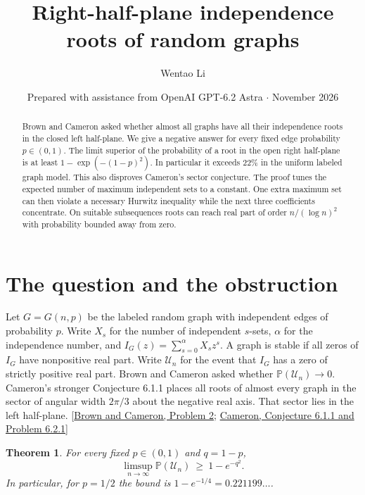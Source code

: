 \documentclass[11pt]{article}
\title{Right-half-plane independence roots of random graphs}
\author{Wentao Li}
\date{Prepared with assistance from OpenAI GPT-6.2 Astra \enspace$\cdot$\enspace 18 November 2026}
\newtheorem{theorem}{Theorem}
\newcommand{\Prob}{\mathbb P}
\newcommand{\Unst}{\mathcal U}
\begin{document}
\maketitle
\begin{abstract}
Brown and Cameron asked whether almost all graphs have all their
independence roots in the closed left half-plane. We give a negative
answer for every fixed edge probability $p\in(0,1)$. The limit superior
of the probability of a root in the open right half-plane is at least
$1-\exp(-(1-p)^2)$. In particular it exceeds $22\%$ in the uniform
labeled graph model. This also disproves Cameron's sector conjecture.
The proof tunes the expected number of maximum independent sets to a
constant. One extra maximum set can then violate a necessary Hurwitz
inequality while the next three coefficients concentrate. On suitable
subsequences roots can reach real part of order $n/(\log n)^2$ with
probability bounded away from zero.
\end{abstract}

\section{The question and the obstruction}
Let $G=G(n,p)$ be the labeled random graph with independent edges of
probability $p$. Write $X_s$ for the number of independent $s$-sets,
$\alpha$ for the independence number, and $I_G(z)=\sum_{s=0}^\alpha X_s z^s$.
A graph is stable if all zeros of $I_G$ have nonpositive real part.
Write $\Unst_n$ for the event that $I_G$ has a zero of strictly positive
real part. Brown and Cameron asked whether $\Prob(\Unst_n)\to0$.
Cameron's stronger Conjecture 6.1.1 places all roots of almost every
graph in the sector of angular width $2\pi/3$ about the negative
real axis. That sector lies in the left half-plane.
[\href{https://doi.org/10.37236/7280}{Brown and Cameron, Problem 2};
\href{https://hdl.handle.net/10222/75412}{Cameron, Conjecture 6.1.1 and Problem 6.2.1}]

\begin{theorem}\label{thm:main}
For every fixed $p\in(0,1)$ and $q=1-p$,
\[
 \limsup_{n\to\infty}\Prob(\Unst_n)\ \ge\ 1-e^{-q^2}.
\]
In particular, for $p=1/2$ the bound is $1-e^{-1/4}=0.221199\ldots$.
\end{theorem}
\end{document}
